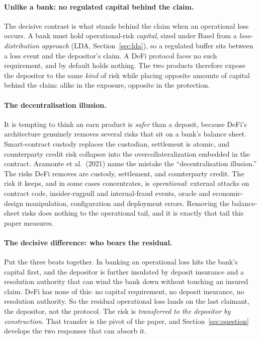 \documentclass[11pt]{article}
\theoremstyle{definition}
\theoremstyle{remark}
\theoremstyle{definition}
\newcommand{\1}{\mathbf{1}}
\begin{document}
\paragraph{Unlike a bank: no regulated capital behind the claim.}
The decisive contrast is what stands behind the claim when an operational loss
occurs. A bank must hold operational-risk \emph{capital}, sized under Basel from
a \emph{loss-distribution approach} (LDA, Section~\ref{sec:lda}), so a regulated
buffer sits between a loss event and the depositor's claim. A DeFi protocol faces
no such requirement, and by default holds nothing. The two products therefore
expose the depositor to the same \emph{kind} of risk while placing opposite
amounts of capital behind the claim: alike in the exposure, opposite in the
protection.

\paragraph{The decentralisation illusion.}
It is tempting to think an earn product is \emph{safer} than a deposit, because
DeFi's architecture genuinely removes several risks that sit on a bank's balance
sheet. Smart-contract custody replaces the custodian, settlement is atomic, and
counterparty credit risk collapses into the overcollateralization embedded in the
contract. Aramonte et al.\ (2021) name the mistake the ``decentralisation
illusion.'' The risks DeFi removes are custody, settlement, and counterparty
credit. The risk it keeps, and in some cases concentrates, is \emph{operational}:
external attacks on contract code, insider-rugpull and internal-fraud events,
oracle and economic-design manipulation, configuration and deployment errors.
Removing the balance-sheet risks does nothing to the operational tail, and it is
exactly that tail this paper measures.

\paragraph{The decisive difference: who bears the residual.}
Put the three beats together. In banking an operational loss hits the bank's
capital first, and the depositor is further insulated by deposit insurance and a
resolution authority that can wind the bank down without touching an insured
claim. DeFi has none of this: no capital requirement, no deposit insurance, no
resolution authority. So the residual operational loss lands on the last
claimant, the depositor, not the protocol. The risk is \emph{transferred to the
depositor by construction}. That transfer is the pivot of the paper, and
Section~\ref{sec:question} develops the two responses that can absorb it.
\end{document}
